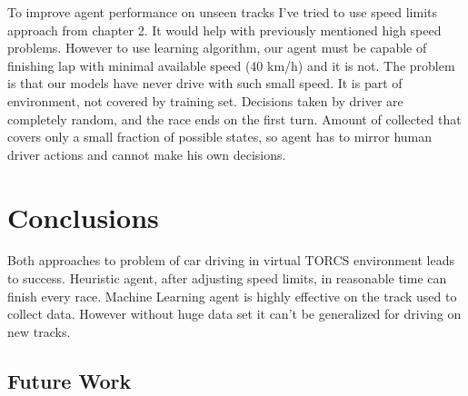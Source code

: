 \documentclass[declaration,shortabstract,english,inz]{iithesis}
\begin{document}
To improve agent performance on unseen tracks I've tried to use speed limits approach from chapter 2.
It would help with previously mentioned high speed problems.
However to use learning algorithm, our agent must be capable of finishing lap with minimal available speed (40 km/h) and it is not.
The problem is that our models have never drive with such small speed.
It is part of environment, not covered by training set.
Decisions taken by driver are completely random, and the race ends on the first turn.
Amount of collected that covers only a small fraction of possible states, so agent has to mirror human driver actions and cannot make his own decisions.


\chapter{Conclusions}


Both approaches to problem of car driving in virtual TORCS environment leads to success.
Heuristic agent, after adjusting speed limits, in reasonable time can finish every race.
Machine Learning agent is highly effective on the track used to collect data.
However without huge data set it can't be generalized for driving on new tracks.


\section{Future Work}
\end{document}
